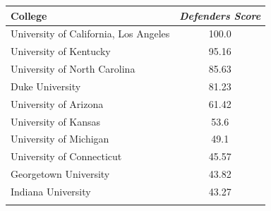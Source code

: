 \documentclass[10pt,a4paper,twocolumn]{article}
\begin{document}
\begin{table}[t]
\begin{tabular}{lc}
	\end{tabular}
	
	\begin{tabular}{lc}
		College & \textit{Defenders Score}  \\
		\hline
		University of California, Los Angeles & 100.0\\
		University of Kentucky & 95.16\\
		University of North Carolina & 85.63\\
		Duke University & 81.23\\
		University of Arizona & 61.42\\
		University of Kansas & 53.6\\
		University of Michigan & 49.1\\
		University of Connecticut & 45.57\\
		Georgetown University & 43.82\\
		Indiana University & 43.27\\
		&\\
		
	\end{tabular}
	
\end{table}
\end{document}
